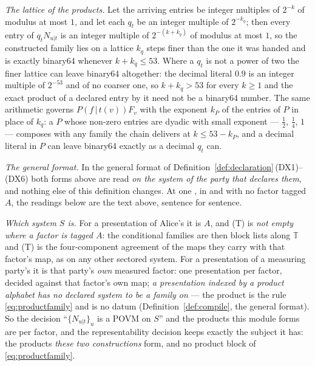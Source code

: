 \begin{definition}
\emph{The lattice of the products.} Let the arriving entries be integer
multiples of $2^{-k}$ of modulus at most $1$, and let each $q_t$ be an
integer multiple of $2^{-k_q}$; then every entry of $q_tN_{u|t}$ is an integer
multiple of $2^{-(k+k_q)}$ of modulus at most $1$, so the constructed family
lies on a lattice $k_q$ steps finer than the one it was handed and is exactly
binary64 whenever $k+k_q\le53$. Where a $q_t$ is not a power of two the finer
lattice can leave binary64 altogether: the decimal literal $0.9$ is an integer
multiple of $2^{-53}$ and of no coarser one, so $k+k_q>53$ for every $k\ge1$
and the exact product of a declared entry by it need not be a binary64
number. The same arithmetic governs $P(f\,|\,t(v))F_v$ with the exponent
$k_P$ of the entries of $P$ in place of $k_q$: a $P$ whose non-zero entries
are dyadic with small exponent --- $\tfrac12$, $\tfrac14$, $1$ --- composes
with any family the chain delivers at $k\le53-k_P$, and a decimal literal in
$P$ can leave binary64 exactly as a decimal $q_t$ can.

\emph{The general format.} In the general format of
Definition~\ref{def:declaration}\,(DX1)--(DX6) both forms above are read
\emph{on the system of the party that declares them}, and nothing else of
this definition changes. At one , in 
and with no factor tagged $A$, the readings below are the text above,
sentence for sentence.

\emph{Which system $S$ is.} For a presentation of Alice's it is $A$, and (T)
is \emph{not empty where a factor is tagged $A$}: the conditional families
are then block lists along $\mathbb{T}$ and (T) is the four-component
agreement of the maps they carry with that factor's map, as on any other
sectored system. For a presentation of a measuring party's it is that party's
\emph{own} measured factor: one presentation per factor, decided against that
factor's own map; \emph{a presentation indexed by a product alphabet has no
declared system to be a family on} --- the product is the rule
\eqref{eq:productfamily} and is no datum (Definition~\ref{def:compile}, the
general format). So the decision ``$\{N_{u|t}\}_u$ is
a POVM on $S$'' and the products this module forms are per factor, and the
representability decision keeps exactly the subject it has: the products
\emph{these two constructions} form, and no product block of
\eqref{eq:productfamily}.


\end{definition}
